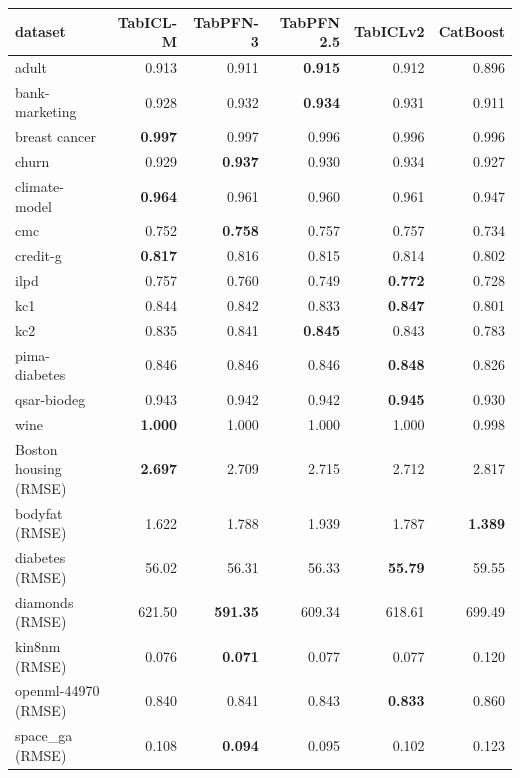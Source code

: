 \begin{tabular}{lrrrrr}
\toprule
dataset & TabICL-M & TabPFN-3 & TabPFN 2.5 & TabICLv2 & CatBoost\\
\midrule
adult & 0.913 & 0.911 & \textbf{0.915} & 0.912 & 0.896\\
bank-marketing & 0.928 & 0.932 & \textbf{0.934} & 0.931 & 0.911\\
breast cancer & \textbf{0.997} & 0.997 & 0.996 & 0.996 & 0.996\\
churn & 0.929 & \textbf{0.937} & 0.930 & 0.934 & 0.927\\
climate-model & \textbf{0.964} & 0.961 & 0.960 & 0.961 & 0.947\\
cmc & 0.752 & \textbf{0.758} & 0.757 & 0.757 & 0.734\\
credit-g & \textbf{0.817} & 0.816 & 0.815 & 0.814 & 0.802\\
ilpd & 0.757 & 0.760 & 0.749 & \textbf{0.772} & 0.728\\
kc1 & 0.844 & 0.842 & 0.833 & \textbf{0.847} & 0.801\\
kc2 & 0.835 & 0.841 & \textbf{0.845} & 0.843 & 0.783\\
pima-diabetes & 0.846 & 0.846 & 0.846 & \textbf{0.848} & 0.826\\
qsar-biodeg & 0.943 & 0.942 & 0.942 & \textbf{0.945} & 0.930\\
wine & \textbf{1.000} & 1.000 & 1.000 & 1.000 & 0.998\\
Boston housing (RMSE) & \textbf{2.697} & 2.709 & 2.715 & 2.712 & 2.817\\
bodyfat (RMSE) & 1.622 & 1.788 & 1.939 & 1.787 & \textbf{1.389}\\
diabetes (RMSE) & 56.02 & 56.31 & 56.33 & \textbf{55.79} & 59.55\\
diamonds (RMSE) & 621.50 & \textbf{591.35} & 609.34 & 618.61 & 699.49\\
kin8nm (RMSE) & 0.076 & \textbf{0.071} & 0.077 & 0.077 & 0.120\\
openml-44970 (RMSE) & 0.840 & 0.841 & 0.843 & \textbf{0.833} & 0.860\\
space\_ga (RMSE) & 0.108 & \textbf{0.094} & 0.095 & 0.102 & 0.123\\
\bottomrule
\end{tabular}